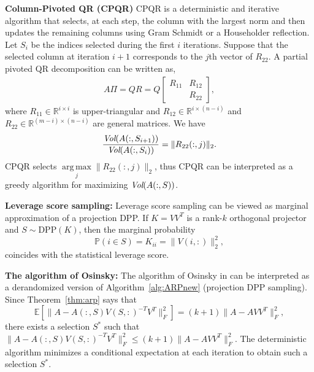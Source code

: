 \documentclass[11pt]{article}
\newcommand{\be}{\begin{eqnarray}}
\newcommand{\ee}{\end{eqnarray}}
\newcommand{\R}{\mathbb{R}}
\newcommand{\<}{\langle}
\renewcommand{\>}{\rangle}
\DeclareMathOperator*{\argmax}{arg\,max}
\begin{document}
\textbf{Column-Pivoted QR (CPQR)}
CPQR is a deterministic and iterative algorithm that selects, at each step,
the column with the largest norm and then updates the remaining columns using Gram Schmidt or a Householder reflection. Let $S_i$ be the indices selected during the first $i$ iterations.  Suppose that the selected column at iteration $i+1$ corresponds to the $j$th vector of $R_{22}$. A partial pivoted QR decomposition can be written as,
\be
A\Pi = QR = Q\begin{bmatrix}
    R_{11} & R_{12}\\
       & R_{22}
\end{bmatrix},
\ee
where $R_{11}\in \R^{i\times i}$ is upper-triangular and $R_{12}\in \R^{i\times (n-i)}$ and $R_{22}\in \R^{(m-i)\times (n - i)}$ are general matrices. We have 
\be
\frac{\emph{Vol}(A(:,S_{i+1}))}{\emph{Vol}(A(:,S_i))} = \|R_{22}(:,j)\|_2.
\ee
CPQR selects $\argmax \limits_j \|R_{22}(:,j)\|_2$, thus CPQR can be interpreted as a greedy algorithm for maximizing $\emph{Vol}(A(:,S))$. 

\textbf{Leverage score sampling:}
Leverage score sampling can be viewed as marginal approximation of a projection DPP.
If $K = VV^T$ is a rank-$k$ orthogonal projector and
$S \sim \mathrm{DPP}(K)$, then
the marginal probability \[
\mathbb{P}(i \in S) = K_{ii} = \|V(i,:)\|_2^2,
\]
coincides with the statistical leverage score.

\textbf{The algorithm of Osinsky:}
The algorithm of Osinsky in \cite{OSINSKY2025359} can be interpreted as a derandomized version of Algorithm~\ref{alg:ARPnew}
(projection DPP sampling). Since Theorem~\ref{thm:arp} says that
\[
\mathbb{E}\left [\|A - A(:,S) V(S,:)^{-T} V^T\|_F^2\right ] = (k+1) \|A - AVV^T\|_F^2,
\]
there exists a selection $S^*$ such that $\|A - A(:,S) V(S,:)^{-T} V^T\|_F^2 \leq (k+1) \|A - AVV^T\|_F^2$. The deterministic algorithm minimizes a conditional expectation at each iteration to obtain such a selection $S^*$.
\end{document}
